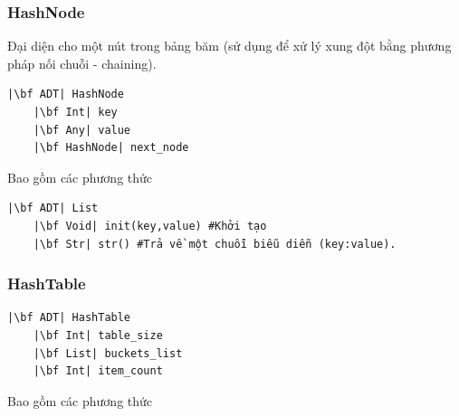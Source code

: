 \subsubsection{HashNode}
 Đại diện cho một nút trong bảng băm (sử dụng để xử lý xung đột bằng phương pháp nối chuỗi - chaining).
\begin{verbatim}
|\bf ADT| HashNode
    |\bf Int| key
    |\bf Any| value
    |\bf HashNode| next_node
\end{verbatim}
Bao gồm các phương thức
\begin{verbatim}
|\bf ADT| List
    |\bf Void| init(key,value) #Khởi tạo
    |\bf Str| str() #Trả về một chuỗi biễu diễn (key:value).
\end{verbatim}
\subsubsection{HashTable}
\begin{verbatim}
|\bf ADT| HashTable
    |\bf Int| table_size
    |\bf List| buckets_list
    |\bf Int| item_count
\end{verbatim}
Bao gồm các phương thức
